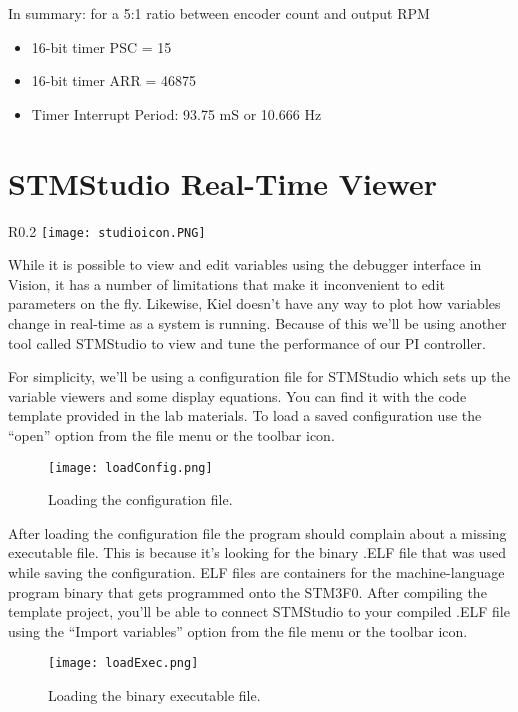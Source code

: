 \documentclass[openany,11pt,fleqn]{book} %
\begin{document}
In summary: for a 5:1 ratio between encoder count and output RPM
\begin{itemize}
    \item 16-bit timer PSC = 15 
    \item 16-bit timer ARR = 46875
    \item Timer Interrupt Period: 93.75 mS or 10.666 Hz
\end{itemize}


\section{STMStudio Real-Time Viewer}

\begin{wrapfigure}{R}{0.2\textwidth}
    \centering\texttt{[image: studioicon.PNG]}
\end{wrapfigure}

While it is possible to view and edit variables using the debugger interface in {\textmu}Vision, it has a number of limitations that make it inconvenient to edit parameters on the fly. Likewise, Kiel doesn't have any way to plot how variables change in real-time as a system is running. Because of this we'll be using another tool called STMStudio to view and tune the performance of our PI controller. 

\noindent For simplicity, we'll be using a configuration file for STMStudio which sets up the variable viewers and some display equations. You can find it with the code template provided in the lab materials. To load a saved configuration use the ``open'' option from the file menu or the toolbar icon.


\begin{figure}[tb]
    \centering\texttt{[image: loadConfig.png]}
    \caption{Loading the configuration file.}
    \label{loadConfig}
\end{figure}

After loading the configuration file the program should complain about a missing executable file. This is because it's looking for the binary .ELF file that was used while saving the configuration. ELF files are containers for the machine-language program binary that gets programmed onto the STM3F0. After compiling the template project, you'll be able to connect STMStudio to your compiled .ELF file using the ``Import variables'' option from the file menu or the toolbar icon.




\begin{figure}[tb]
    \centering\texttt{[image: loadExec.png]}
    \caption{Loading the binary executable file.}
    \label{loadExec}
\end{figure}
\end{document}

